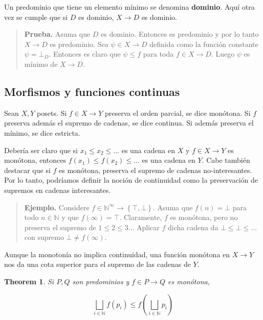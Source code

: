 \documentclass[article, 12pt]{article}
\newtheorem{theorem}{Theorem}
\newtheorem{theorem}{Theorem}
\begin{document}
Un predominio que tiene un elemento mínimo se denomina \textbf{dominio}. Aquí
otra vez se cumple que si $D$ es dominio, $X \to D$ es dominio.

\small
\begin{quote}

\textbf{Prueba.} Asuma que $D$ es dominio. Entonces es predominio y por lo tanto
$X \to D$ es predominio. Sea $\psi \in X \to D$ definida como la función
constante $\psi = \bot_D$. Entonces es claro que $\psi \leq f$ para toda $f \in
X \to D$. Luego $\psi$ es mínimo de $X \to D$.


\end{quote}
\normalsize

\subsection{Morfismos y funciones continuas}

Sean $X, Y$ posets. Si $f \in X \to Y$ preserva el orden parcial, se dice
monótona. Si $f$ preserva además el supremo de cadenas, se dice continua. Si
además preserva el mínimo, se dice estricta.

Debería ser claro que si $x_1 \leq x_2 \leq \ldots$ es una cadena en $X$ y $f
\in X \to Y$ es monótona, entonces $f(x_1) \leq f(x_2) \leq \ldots$ es una
cadena en $Y$. Cabe también destacar que si $f$ es monótona, preserva el supremo
de cadenas no-interesantes. Por lo tanto, podríamos definir la noción de
continuidad como la preservación de supremos en cadenas interesantes.


\small
\begin{quote}

  \textbf{Ejemplo.} Considere $f \in \mathbb{N}^\infty \to \left\{ \top, \bot
  \right\} $. Asuma que $f(n) = \bot $ para todo $n \in \mathbb{N}$ y que
  $f(\infty) = \top$. Claramente, $f$ es monótona, pero no preserva el supremo
  de $1 \leq 2 \leq 3\ldots$ Aplicar $f$ dicha cadena da $\bot  \leq \bot  \leq
  \ldots$ con supremo $\bot \neq f(\infty)$.

\end{quote}
\normalsize

Aunque la monotonía no implica continuidad, una función monótona en $X \to Y$ nos da una cota
superior para el supremo de las cadenas de $Y$.

\begin{theorem}
  Si $P, Q$ son predominios y $f \in P \to Q$ es monótona, 

  \begin{equation*}
    \bigsqcup_{i \in \mathbb{N}} f(p_i) \leq f \left( \bigsqcup_{i \in
    \mathbb{N}} p_i \right) 
  \end{equation*}
\end{theorem}
\end{document}
